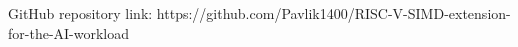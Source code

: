 \chapter{} \label{Appendix_D}

GitHub repository link: https://github.com/Pavlik1400/RISC-V-SIMD-extension-for-the-AI-workload 